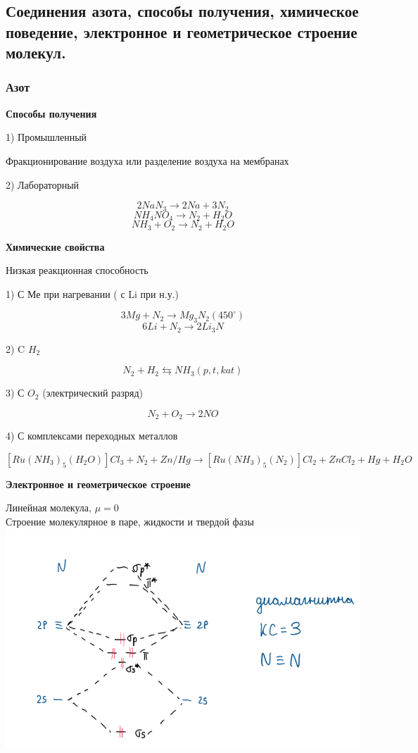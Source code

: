 

\subsection{Соединения азота, способы получения, химическое поведение, электронное и геометрическое строение молекул.}

\subsubsection*{Азот}

\textbf{Способы получения}

1) Промышленный

Фракционирование воздуха или разделение воздуха на мембранах

2) Лабораторный

$$2NaN_3 \rightarrow 2Na + 3N_2$$
$$NH_4NO_4 \rightarrow N_2 + H_2O$$
$$NH_3 + O_2 \rightarrow N_2 + H_2O$$

\textbf{Химические свойства}

Низкая реакционная способность

1) С Ме при нагревании ( с Li при н.у.)

$$3Mg + N_2 \rightarrow Mg_3N_2 (450^{\circ})$$
$$6Li + N_2 \rightarrow 2Li_3N$$

2) C $H_2$

$$N_2 + H_2 \leftrightarrows NH_3 (p,t,kat)$$

3) С $O_2$ (электрический разряд)

$$N_2 + O_2 \rightarrow 2NO$$

4) С комплексами переходных металлов

$$[Ru(NH_3)_5(H_2O)]Cl_3 + N_2 + Zn/Hg \rightarrow [Ru(NH_3)_5(N_2)]Cl_2 + ZnCl_2 + Hg + H_2O$$

\textbf{Электронное и геометрическое строение}

Линейная молекула, $\mu=0$\\
Строение молекулярное в паре, жидкости и твердой фазы\\
\includegraphics{images/8v1.png}

